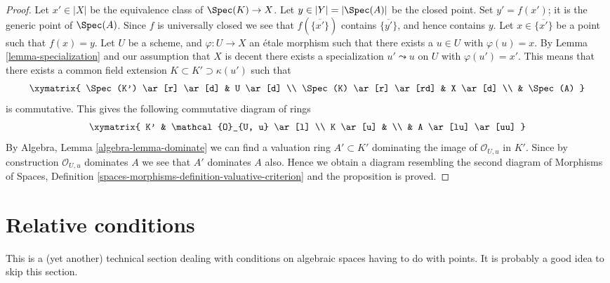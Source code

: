 \begin{proof}
\medskip\noindent
Let $x' \in |X|$ be the equivalence class of
$\Spec(K) \to X$. Let $y \in |Y| = |\Spec(A)|$ be
the closed point. Set $y' = f(x')$; it is the generic point of
$\Spec(A)$. Since $f$ is universally closed we see that
$f(\overline{\{x'\}})$ contains $\overline{\{y'\}}$, and hence
contains $y$. Let $x \in \overline{\{x'\}}$ be a point such that
$f(x) = y$. Let $U$ be a scheme, and $\varphi : U \to X$
an \'etale morphism such that there exists a $u \in U$ with
$\varphi(u) = x$. By
Lemma \ref{lemma-specialization}
and our assumption that $X$ is decent
there exists a specialization $u' \leadsto u$ on $U$ with $\varphi(u') = x'$.
This means that there exists a common field extension
$K \subset K' \supset \kappa(u')$ such that
$$
\xymatrix{
\Spec(K') \ar[r] \ar[d] & U \ar[d] \\
\Spec(K) \ar[r] \ar[rd] & X \ar[d] \\
 & \Spec(A)
}
$$
is commutative. This gives the following commutative diagram of rings
$$
\xymatrix{
K' & \mathcal{O}_{U, u} \ar[l] \\
K \ar[u] & \\
 & A \ar[lu] \ar[uu]
}
$$
By
Algebra, Lemma \ref{algebra-lemma-dominate}
we can find a valuation ring $A' \subset K'$ dominating the image of
$\mathcal{O}_{U, u}$ in $K'$. Since by construction $\mathcal{O}_{U, u}$
dominates $A$ we see that $A'$ dominates $A$ also. Hence we obtain a diagram
resembling the second diagram of
Morphisms of Spaces,
Definition \ref{spaces-morphisms-definition-valuative-criterion}
and the proposition is proved.
\end{proof}











\section{Relative conditions}
\label{section-relative-conditions}

\noindent
This is a (yet another) technical section dealing with conditions on
algebraic spaces having to do with points. It is probably a good idea
to skip this section.

